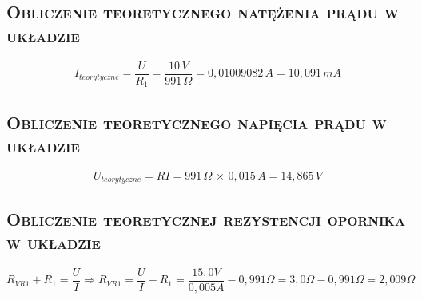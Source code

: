 \documentclass[,a4paper,12pt]{article}
\begin{document}
\subsection{\textsc{Obliczenie teoretycznego natężenia prądu w układzie}}
\begin{equation}
    I_{teorytyczne}=\frac{U}{R_1}=\frac{10\,V}{991\,\Omega}=0,01009082\,A= 10,091\,mA
    \label{Iteoryt1}
\end{equation}
\subsection{\textsc{Obliczenie teoretycznego napięcia prądu w układzie}}
\begin{equation}
    U_{teorytyczne}=RI = 991\,\Omega\,\times\,0,015\,A = 14,865\,V
    \label{Vteoryt1}
\end{equation}
\subsection{\textsc{Obliczenie teoretycznej rezystencji opornika w układzie}}
\begin{equation}
    R_{VR1}+R_1=\frac{U}{I} \Longrightarrow R_{VR1}=\frac{U}{I}-R_1 = \frac{15,0V}{0,005A}-0,991\Omega=3,0\Omega-0,991\Omega=2,009\Omega 
    \label{Rteoryt}
\end{equation}
\end{document}

